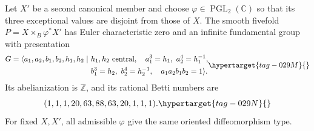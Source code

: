 \begin{theorem}\hypertarget{tag-02MN}{}\label{maps:src:E.2.3}


Let $X'$ be a second canonical member and choose $\varphi\in
\operatorname{PGL}_2(\mathbb C)$ so that its three exceptional
values are disjoint from those of $X$.  The smooth fivefold
$P=X\times_B\varphi^*X'$ has Euler characteristic zero and
an infinite fundamental group with presentation
\begin{equation}
\begin{split}
G=\langle a_1,a_2,b_1,b_2,h_1,h_2\mid\ &
 h_1,h_2\ \text{central},\quad
 a_1^3=h_1,\ a_2^4=h_1^{-1},\\
 &b_1^3=h_2,\ b_2^4=h_2^{-1},\quad
 a_1a_2b_1b_2=1\rangle .
\end{split}
\hypertarget{tag-029M}{}\label{maps:eq:E.16}
\end{equation}
Its abelianization is $\mathbb Z$, and its rational Betti numbers are
\begin{equation}
 (1,1,1,20,63,88,63,20,1,1,1).
 \hypertarget{tag-029N}{}\label{maps:eq:E.17}
\end{equation}
For fixed $X,X'$, all admissible $\varphi$ give the same oriented
diffeomorphism type.

\end{theorem}


